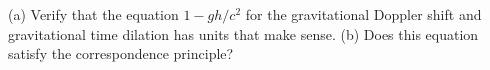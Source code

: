 (a) Verify that the equation $1-gh/c^2$ for the gravitational Doppler shift and gravitational time dilation has units that make sense.
(b) Does this equation satisfy the correspondence principle?
